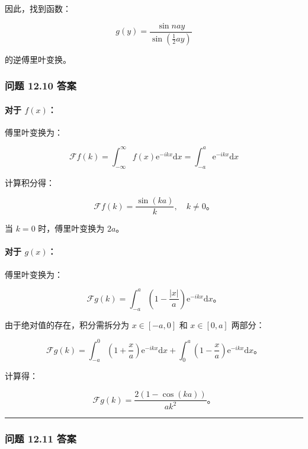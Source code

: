 因此，找到函数：

$$
g(y) = \frac{\sin n a y}{\sin \left(\frac{1}{2} a y\right)}
$$

的逆傅里叶变换。

\subsubsection{问题 12.10 答案}\label{ux95eeux9898-12.10-ux7b54ux6848}

\paragraph{\texorpdfstring{对于
$f(x)$：}{对于 f(x)：}}\label{ux5bf9ux4e8e-fx}

傅里叶变换为：

$$
\mathcal{F}f(k) = \int_{-\infty}^\infty f(x) \mathrm{e}^{-i k x} \mathrm{d}x = \int_{-a}^a \mathrm{e}^{-i k x} \mathrm{d}x
$$

计算积分得：

$$
\mathcal{F}f(k) = \frac{\sin(ka)}{k}, \quad k \neq 0。
$$

当 $k = 0$ 时，傅里叶变换为 $2a$。

\paragraph{\texorpdfstring{对于
$g(x)$：}{对于 g(x)：}}\label{ux5bf9ux4e8e-gx}

傅里叶变换为：

$$
\mathcal{F}g(k) = \int_{-a}^a \left(1 - \frac{|x|}{a}\right) \mathrm{e}^{-i k x} \mathrm{d}x。
$$

由于绝对值的存在，积分需拆分为 $x \in [-a, 0]$ 和 $x \in [0, a]$
两部分：

$$
\mathcal{F}g(k) = \int_{-a}^0 \left(1 + \frac{x}{a}\right) \mathrm{e}^{-i k x} \mathrm{d}x + \int_{0}^a \left(1 - \frac{x}{a}\right) \mathrm{e}^{-i k x} \mathrm{d}x。
$$

计算得：

$$
\mathcal{F}g(k) = \frac{2(1 - \cos(ka))}{a k^2}。
$$

\begin{center}\rule{0.5\linewidth}{0.5pt}\end{center}

\subsubsection{问题 12.11 答案}\label{ux95eeux9898-12.11-ux7b54ux6848}

